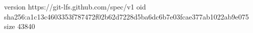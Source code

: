 version https://git-lfs.github.com/spec/v1
oid sha256:a1c13c4603353f787472f02b62d7228d5ba6dc6b7e03fcae377ab1022ab9e075
size 43840
